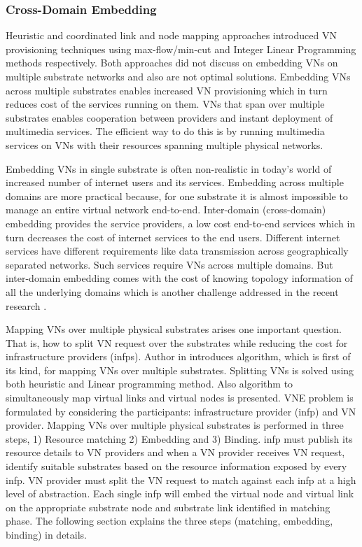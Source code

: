 \documentclass[article,dr=phil,type=msc ,colorback,accentcolor=tud4b]{tudthesis}
\begin{document}
\newpage
\subsubsection{Cross-Domain Embedding} \label{CDE}
Heuristic and coordinated link and node mapping approaches introduced VN provisioning techniques using max-flow/min-cut and Integer Linear Programming methods respectively. Both approaches did not discuss on embedding VNs on multiple substrate networks and also are not optimal solutions. Embedding VNs across multiple substrates enables increased VN provisioning which in turn reduces cost of the services running on them. VNs that span over multiple substrates enables cooperation between providers and instant deployment of multimedia services. The efficient way to do this is by running multimedia services on VNs with their resources spanning multiple physical networks.\newline

Embedding VNs in single substrate is often non-realistic in today's world of increased number of internet users and its services. Embedding across multiple domains are more practical because, for one substrate it is almost impossible to manage an entire virtual network end-to-end. Inter-domain (cross-domain) embedding provides the service providers, a low cost end-to-end services which in turn decreases the cost of  internet services to the end users. Different internet services have different requirements like data transmission across geographically separated networks. Such services require VNs across multiple domains. But inter-domain embedding comes with the cost of knowing topology information of all the underlying domains which is another challenge addressed in the recent research .\newline

Mapping VNs over multiple physical substrates arises one important question. That is, how to split VN request over the substrates while reducing the cost for infrastructure providers (infps). Author in \cite{vn_multiple} introduces algorithm, which is first of its kind, for mapping VNs over multiple substrates. Splitting VNs is solved using both heuristic and Linear programming method. Also algorithm to simultaneously map virtual links and virtual nodes is presented. VNE problem is formulated by considering the participants: infrastructure provider (infp) and VN provider. Mapping VNs over multiple physical substrates is performed in three steps, 1) Resource matching 2) Embedding and 3) Binding. infp must publish its resource details to VN providers and when a VN provider receives VN request, identify suitable substrates based on the resource information exposed by every infp. VN provider must split the VN request to match against each infp at a high level of abstraction. Each single infp will embed the virtual node and virtual link on the appropriate substrate node and substrate link identified in matching phase. The following section explains the three steps (matching, embedding, binding) in details.\newline
\end{document}
